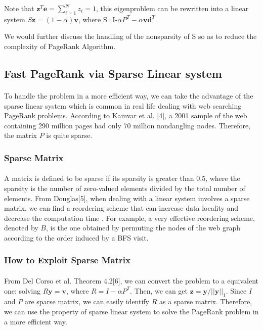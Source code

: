 \documentclass[a0,portrait]{a0poster}
\begin{document}
\begin{multicols}{2}
        Note that $\textbf{z}^T\textbf{e}=\sum^N_{i=1}z_i=1$,
        this eigenproblem can be rewritten into a linear system
        $S\textbf{z}=(1-\alpha)\textbf{v}$,
        where S=I-$\alpha P^T-\alpha\textbf{vd}^T$.
        
        We would further discuss the handling of the nonsparsity of S so as to reduce the complexity of PageRank Algorithm.
\subsection*{Fast PageRank via Sparse Linear system}
\paragraph{}
To handle the problem in a more efficient way, we can take the advantage of the sparse linear system which is common in real life dealing with web searching PageRank problems.  According to Kamvar et al. [4], a 2001 sample of the web containing 290 million pages had only 70 million nondangling nodes. Therefore, the matrix $P$ is quite sparse.
\subsubsection*{Sparse Matrix}
\paragraph{}
A matrix is defined to be sparse if its sparsity is greater than 0.5, where the sparsity is the number of zero-valued elements divided by the total number of elements. From Douglas[5], when dealing with a  linear system involves a sparse matrix, we can find a reordering scheme that can increase data locality and decrease the computation time . For example, a very eﬀective reordering scheme, denoted by $B$, is the one obtained by permuting the nodes of the web graph according to the order induced by a BFS visit.

\subsubsection*{How to Exploit Sparse Matrix}
\paragraph{}
From Del Corso et al. Theorem 4.2[6], we can convert the problem to a equivalent one: solving $R\mathbf{y}=\mathbf{v}$, where $R=I-\alpha P^T$. Then, we can get $\mathbf{z} = \mathbf{y}/ ||\mathbf{y}||_1$. Since $I$ and $P$ are sparse matrix, we can easily identify $R$ as a sparse matrix. Therefore, we can use the property of sparse linear system to solve the PageRank problem in a more efficient way.


\end{multicols}
\end{document}
